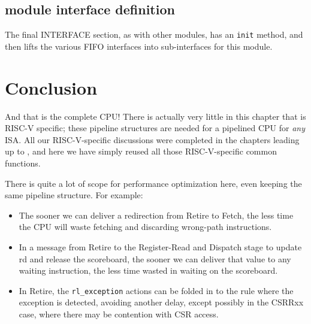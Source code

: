 
\subsection{{\FIFE} module interface definition}

The final INTERFACE section, as with other modules, has an \verb|init|
method, and then lifts the various FIFO interfaces into sub-interfaces
for this module.



\section{Conclusion}

And that is the complete {\FIFE} CPU!  There is actually very little in
this chapter that is RISC-V specific; these pipeline structures are
needed for a pipelined CPU for \emph{any} ISA.  All our
RISC-V-specific discussions were completed in the chapters leading up
to {\DRUM}, and here we have simply reused all those RISC-V-specific
common functions.

There is quite a lot of scope for performance optimization here, even
keeping the same pipeline structure.  For example:

\begin{itemize}

\item The sooner we can deliver a redirection from Retire to Fetch,
      the less time the CPU will waste fetching and discarding
      wrong-path instructions.

\item In a message from Retire to the Register-Read and Dispatch stage
      to update rd and release the scoreboard, the sooner we can
      deliver that value to any waiting instruction, the less time
      wasted in waiting on the scoreboard.

\item In Retire, the \verb|rl_exception| actions can be folded in to
      the rule where the exception is detected, avoiding another
      delay, except possibly in the CSRRxx case, where there may be
      contention with CSR access.

\end{itemize}

